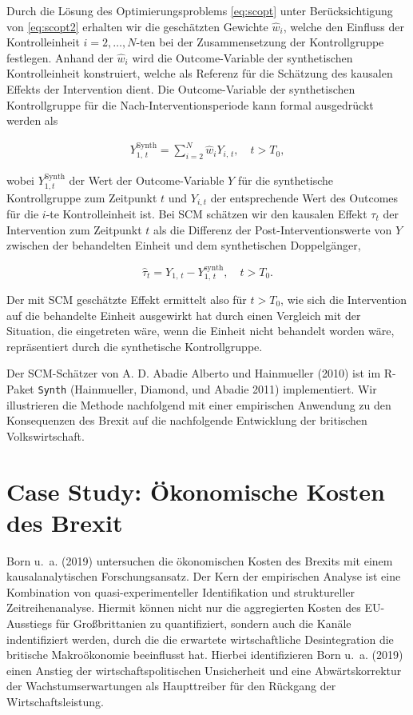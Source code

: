 \documentclass[
  a4paper,
  DIV=11,
  oneside]{scrreprt}
\begin{document}
Durch die Lösung des Optimierungsproblems \eqref{eq:scopt} unter
Berücksichtigung von \eqref{eq:scopt2} erhalten wir die geschätzten
Gewichte \(\widehat{w}_i\), welche den Einfluss der Kontrolleinheit
\(i=2,\dots,N\)-ten bei der Zusammensetzung der Kontrollgruppe
festlegen. Anhand der \(\widehat{w}_i\) wird die Outcome-Variable der
synthetischen Kontrolleinheit konstruiert, welche als Referenz für die
Schätzung des kausalen Effekts der Intervention dient. Die
Outcome-Variable der synthetischen Kontrollgruppe für die
Nach-Interventionsperiode kann formal ausgedrückt werden als

\begin{align}
  Y_{1,\,t}^{\text{Synth}} = \sum_{i=2}^{N} \widehat{w}_i Y_{i,\,t},\quad t > T_0,\label{eq:dgkonst}
\end{align}

wobei \(Y_{1,t}^{\text{Synth}}\) der Wert der Outcome-Variable \(Y\) für
die synthetische Kontrollgruppe zum Zeitpunkt \(t\) und \(Y_{i,t}\) der
entsprechende Wert des Outcomes für die \(i\)-te Kontrolleinheit ist.
Bei SCM schätzen wir den kausalen Effekt \(\tau_t\) der Intervention zum
Zeitpunkt \(t\) als die Differenz der Post-Interventionswerte von \(Y\)
zwischen der behandelten Einheit und dem synthetischen Doppelgänger,

\[
\widehat{\tau}_t = Y_{1,\,t} - Y_{1,\,t}^{\text{synth}},\quad t > T_0.
\]

Der mit SCM geschätzte Effekt ermittelt also für \(t > T_0\), wie sich
die Intervention auf die behandelte Einheit ausgewirkt hat durch einen
Vergleich mit der Situation, die eingetreten wäre, wenn die Einheit
nicht behandelt worden wäre, repräsentiert durch die synthetische
Kontrollgruppe.

Der SCM-Schätzer von A. D. Abadie Alberto und Hainmueller (2010) ist im
R-Paket \texttt{Synth} (Hainmueller, Diamond, und Abadie 2011)
implementiert. Wir illustrieren die Methode nachfolgend mit einer
empirischen Anwendung zu den Konsequenzen des Brexit auf die
nachfolgende Entwicklung der britischen Volkswirtschaft.

\section{Case Study: Ökonomische Kosten des
Brexit}\label{case-study-uxf6konomische-kosten-des-brexit}

Born u.~a. (2019) untersuchen die ökonomischen Kosten des Brexits mit
einem kausalanalytischen Forschungsansatz. Der Kern der empirischen
Analyse ist eine Kombination von quasi-experimenteller Identifikation
und struktureller Zeitreihenanalyse. Hiermit können nicht nur die
aggregierten Kosten des EU-Ausstiegs für Großbrittanien zu
quantifiziert, sondern auch die Kanäle indentifiziert werden, durch die
die erwartete wirtschaftliche Desintegration die britische Makroökonomie
beeinflusst hat. Hierbei identifizieren Born u.~a. (2019) einen Anstieg
der wirtschaftspolitischen Unsicherheit und eine Abwärtskorrektur der
Wachstumserwartungen als Haupttreiber für den Rückgang der
Wirtschaftsleistung.
\end{document}
